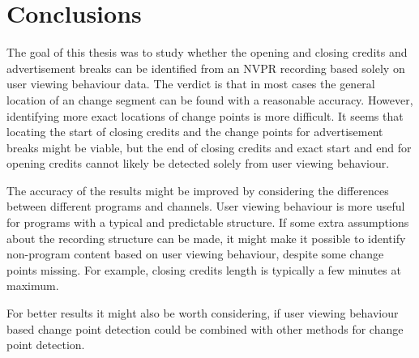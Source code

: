


\section{Conclusions} \label{sec:conclusions} %

The goal of this thesis was to study whether the opening and closing credits and advertisement breaks can be identified from an NVPR recording based solely on user viewing behaviour data. The verdict is that in most cases the general location of an change segment can be found with a reasonable accuracy. However, identifying more exact locations of change points is more difficult. It seems that locating the start of closing credits and the change points for advertisement breaks might be viable, but the end of closing credits and exact start and end for opening credits cannot likely be detected solely from user viewing behaviour.

The accuracy of the results might be improved by considering the differences between different programs and channels. User viewing behaviour is more useful for programs with a typical and predictable structure. If some extra assumptions about the recording structure can be made, it might make it possible to identify non-program content based on user viewing behaviour, despite some change points missing. For example, closing credits length is typically a few minutes at maximum.

For better results it might also be worth considering, if user viewing behaviour based change point detection could be combined with other methods for change point detection. %

